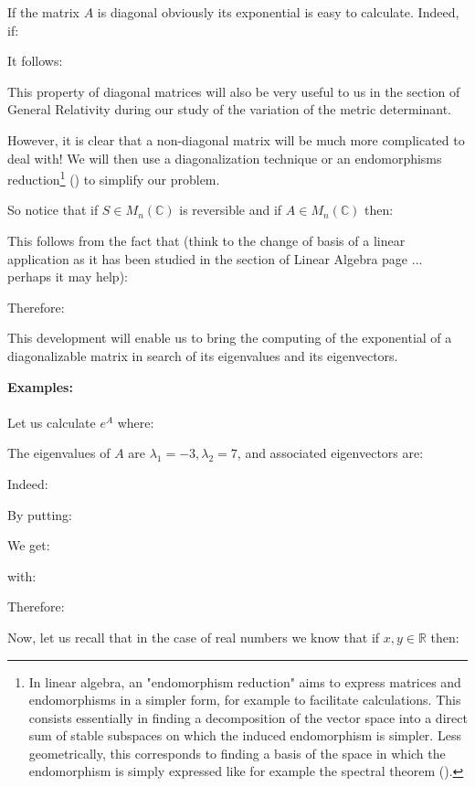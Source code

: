 	If the matrix $A$ is diagonal obviously its exponential is easy to calculate. Indeed, if:
	
	It follows:
	
	This property of diagonal matrices will also be very useful to us in the section of General Relativity during our study of the variation of the metric determinant.
	
	However, it is clear that a non-diagonal matrix will be much more complicated to deal with! We will then use a diagonalization technique or an endomorphisms reduction\footnote{In linear algebra, an "endomorphism reduction" aims to express matrices and endomorphisms in a simpler form, for example to facilitate calculations. This consists essentially in finding a decomposition of the vector space into a direct sum of stable subspaces on which the induced endomorphism is simpler. Less geometrically, this corresponds to finding a basis of the space in which the endomorphism is simply expressed like for example the spectral theorem ().} () to simplify our problem.
	
	So notice that if $S\in M_n(\mathbb{C})$ is reversible and if $A\in M_n(\mathbb{C})$ then:
	
	This follows from the fact that (think to the change of basis of a linear application as it has been studied in the section of Linear Algebra page \pageref{change of basis}... perhaps it may help):
	
	Therefore:
	
	This development will enable us to bring the computing of the exponential of a diagonalizable matrix in search of its eigenvalues and its eigenvectors.
	\begin{tcolorbox}[colframe=black,colback=white,sharp corners]
	\textbf{{\Large {}}Examples:}\\\\
	Let us calculate $e^A$ where:
	
	The eigenvalues of $A$ are $\lambda_1=-3,\lambda_2=7$, and associated eigenvectors are:
	
	Indeed:
	
	By putting:
	
	We get:
	
	with:
	
	Therefore:
	
	\end{tcolorbox}
	Now, let us recall that in the case of real numbers we know that if $x,y\in \mathbb{R}$ then:
	

